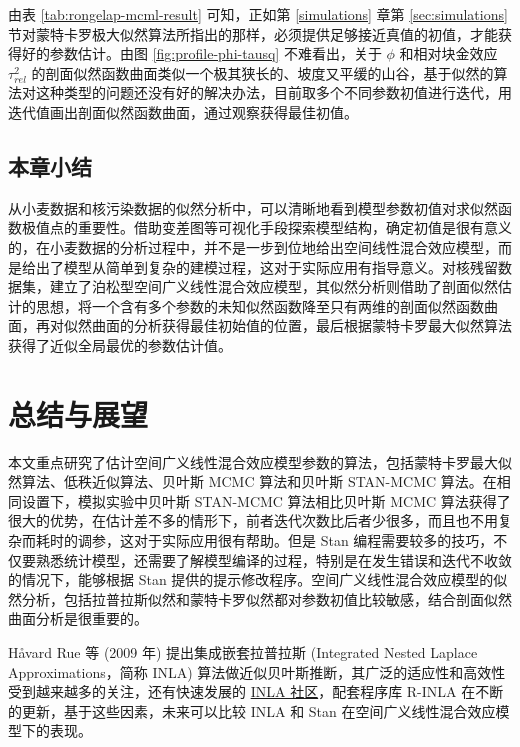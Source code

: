\documentclass[12pt,a4paper,UTF8,twoside]{book}
\theoremstyle{definition}
\theoremstyle{definition}
\theoremstyle{definition}
\theoremstyle{remark}
\begin{document}
由表 \ref{tab:rongelap-mcml-result} 可知，正如第 \ref{simulations} 章第
\ref{sec:simulations}
节对蒙特卡罗极大似然算法所指出的那样，必须提供足够接近真值的初值，才能获得好的参数估计。由图
\ref{fig:profile-phi-tausq} 不难看出，关于 \(\phi\) 和相对块金效应
\(\tau^2_{rel}\)
的剖面似然函数曲面类似一个极其狭长的、坡度又平缓的山谷，基于似然的算法对这种类型的问题还没有好的解决办法，目前取多个不同参数初值进行迭代，用迭代值画出剖面似然函数曲面，通过观察获得最佳初值。

\hypertarget{sec:cases}{%
\section{本章小结}\label{sec:cases}}

从小麦数据和核污染数据的似然分析中，可以清晰地看到模型参数初值对求似然函数极值点的重要性。借助变差图等可视化手段探索模型结构，确定初值是很有意义的，在小麦数据的分析过程中，并不是一步到位地给出空间线性混合效应模型，而是给出了模型从简单到复杂的建模过程，这对于实际应用有指导意义。对核残留数据集，建立了泊松型空间广义线性混合效应模型，其似然分析则借助了剖面似然估计的思想，将一个含有多个参数的未知似然函数降至只有两维的剖面似然函数曲面，再对似然曲面的分析获得最佳初始值的位置，最后根据蒙特卡罗最大似然算法获得了近似全局最优的参数估计值。

\hypertarget{summary}{%
\chapter{总结与展望}\label{summary}}

本文重点研究了估计空间广义线性混合效应模型参数的算法，包括蒙特卡罗最大似然算法、低秩近似算法、贝叶斯
MCMC 算法和贝叶斯 STAN-MCMC 算法。在相同设置下，模拟实验中贝叶斯
STAN-MCMC 算法相比贝叶斯 MCMC
算法获得了很大的优势，在估计差不多的情形下，前者迭代次数比后者少很多，而且也不用复杂而耗时的调参，这对于实际应用很有帮助。但是
Stan
编程需要较多的技巧，不仅要熟悉统计模型，还需要了解模型编译的过程，特别是在发生错误和迭代不收敛的情况下，能够根据
Stan
提供的提示修改程序。空间广义线性混合效应模型的似然分析，包括拉普拉斯似然和蒙特卡罗似然都对参数初值比较敏感，结合剖面似然曲面分析是很重要的。

Håvard Rue 等 (2009 年) \citep{Rue2009} 提出集成嵌套拉普拉斯 (Integrated
Nested Laplace Approximations，简称 INLA)
算法做近似贝叶斯推断，其广泛的适应性和高效性受到越来越多的关注，还有快速发展的
\href{http://www.r-inla.org/}{INLA 社区}，配套程序库 R-INLA
在不断的更新，基于这些因素，未来可以比较 INLA 和 Stan
在空间广义线性混合效应模型下的表现。
\end{document}
